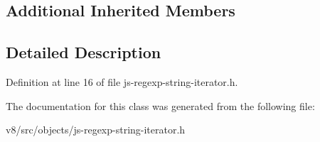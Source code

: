 \subsection*{Additional Inherited Members}


\subsection{Detailed Description}


Definition at line 16 of file js-\/regexp-\/string-\/iterator.\+h.



The documentation for this class was generated from the following file\+:\begin{DoxyCompactItemize}
\item 
v8/src/objects/js-\/regexp-\/string-\/iterator.\+h\end{DoxyCompactItemize}
